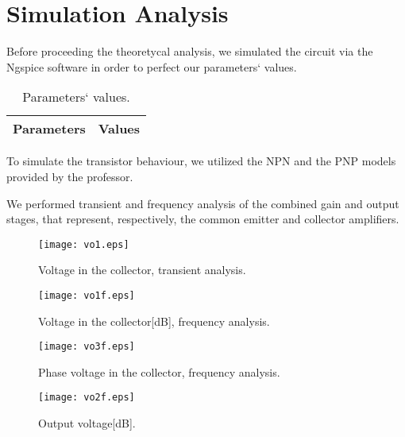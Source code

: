 \section{Simulation Analysis}
\label{sec:simulation}

Before proceeding the theoretycal analysis, we simulated the circuit via the Ngspice software in order to perfect our parameters` values.

\begin{table}[h]
  \centering
  \begin{tabular}{|l|r|}
    \hline    
    {\bf Parameters} & {\bf Values} \\ \hline
    
  \end{tabular}
  \caption{Parameters` values.}
  \label{tab:s01}
\end{table}

To simulate the transistor behaviour, we utilized the NPN and the PNP models provided by the professor.

We performed transient and frequency analysis of the combined gain and output stages, that represent, respectively, the common emitter and collector amplifiers.

\begin{figure}[h] \centering
\texttt{[image: vo1.eps]}
\caption{Voltage in the collector, transient analysis.}
\label{fig:s1}
\end{figure}


\begin{figure}[h] \centering
\texttt{[image: vo1f.eps]}
\caption{Voltage in the collector[dB], frequency analysis.}
\label{fig:s2}
\end{figure}

\vspace{10.0cm}

\begin{figure}[h] \centering
\texttt{[image: vo3f.eps]}
\caption{Phase voltage in the collector, frequency analysis.}
\label{fig:s3}
\end{figure}

\vspace{10.0cm}


\begin{figure}[h] \centering
\texttt{[image: vo2f.eps]}
\caption{Output voltage[dB].}
\label{fig:s4}
\end{figure}

\vspace{10.0cm}

